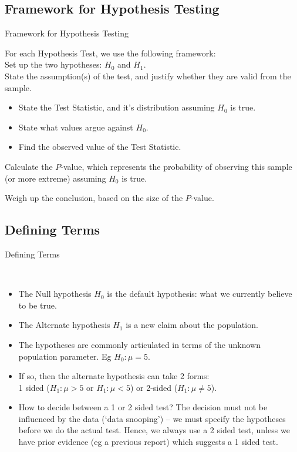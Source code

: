 \documentclass[t,xcolor=pdftex,dvipsnames,table]{beamer}\usepackage[]{graphicx}\usepackage[]{color}
\begin{document}
\subsection[]{Framework for Hypothesis Testing}
\begin{frame}[fragile]{Framework for Hypothesis Testing}

For each Hypothesis Test,  we use the following framework: \\

\vspace{.5cm}
 Set up the two hypotheses: $H_{0}$ and $H_{1}$. \\

 State the assumption(s) of the test, and justify whether they are valid from the sample.

\begin{itemize}
\item State the Test Statistic, and it's distribution assuming $H_{0}$ is true. 
\item State what values argue against $H_{0}$.
\item Find the observed value of the Test Statistic.
\end{itemize}

 Calculate the $P$-value, which represents the probability of observing this sample (or more extreme) assuming $H_{0}$ is true.

 Weigh up the conclusion, based on the size of the $P$-value.
\end{frame}

\subsection[]{Defining Terms}
\begin{frame}[fragile]{Defining Terms}

 \\

\begin{itemize}
\item 
The Null hypothesis $H_{0}$ is the default hypothesis: what we currently believe to be true. \\
\item
The Alternate hypothesis $H_{1}$ is a new claim about the population. \\
\item The hypotheses are commonly articulated in terms of the unknown population parameter. Eg $H_{0}: \mu = 5$.
\item If so, then the alternate hypothesis can take 2 forms: \\
1 sided ($H_{1}: \mu > 5$ or
$H_{1}: \mu < 5$) or 2-sided ($H_{1}: \mu \neq 5$).
\item How to decide between a 1 or 2 sided test?
The decision must not be influenced by the data (`data snooping') – we must specify the hypotheses before we do the actual test. Hence, we always use a 2 sided test, unless we have prior evidence (eg a previous report) which suggests a 1 sided test.
\end{itemize}
\end{frame}
\end{document}
